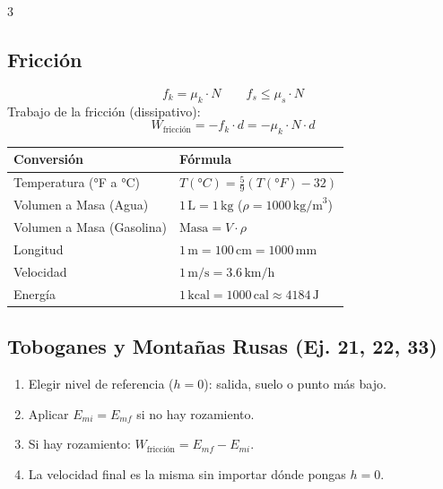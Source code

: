 \documentclass[10pt,landscape]{article}
\begin{document}
\begin{multicols}{3}
\subsection*{Fricci\'{o}n}
\[
f_k = \mu_k \cdot N \qquad f_s \leq \mu_s \cdot N
\]
Trabajo de la fricci\'{o}n (dissipativo):
\[
W_{\text{fricci\'{o}n}} = -f_k \cdot d = -\mu_k \cdot N \cdot d
\]

\vspace{4pt}

\begin{center}
\begin{tabular}{@{}ll@{}}
\toprule
\textbf{Conversi\'{o}n} & \textbf{F\'{o}rmula} \\
\midrule
Temperatura (°F a °C) & $T(°C) = \frac{5}{9}(T(°F) - 32)$ \\
Volumen a Masa (Agua) & $1\,\text{L} = 1\,\text{kg}$ ($\rho = 1000\,\text{kg/m}^3$) \\
Volumen a Masa (Gasolina) & $\text{Masa} = V \cdot \rho$ \\
Longitud & $1\,\text{m} = 100\,\text{cm} = 1000\,\text{mm}$ \\
Velocidad & $1\,\text{m/s} = 3.6\,\text{km/h}$ \\
Energ\'{i}a & $1\,\text{kcal} = 1000\,\text{cal} \approx 4184\,\text{J}$ \\
\bottomrule
\end{tabular}
\end{center}




\subsection*{Toboganes y Monta\~{n}as Rusas (Ej. 21, 22, 33)}
\begin{enumerate}[leftmargin=*,nosep,topsep=0pt]
  \item Elegir nivel de referencia ($h=0$): salida, suelo o punto m\'{a}s bajo.
  \item Aplicar $E_{mi} = E_{mf}$ si no hay rozamiento.
  \item Si hay rozamiento: $W_{\text{fricci\'{o}n}} = E_{mf} - E_{mi}$.
  \item La velocidad final es la misma sin importar d\'{o}nde pongas $h=0$.
\end{enumerate}


\end{multicols}
\end{document}
